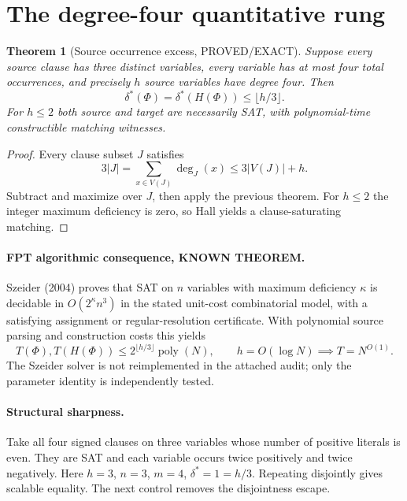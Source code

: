 \documentclass[11pt]{article}
\newtheorem{theorem}{Theorem}
\begin{document}
\section{The degree-four quantitative rung}
\begin{theorem}[Source occurrence excess, PROVED/EXACT]
Suppose every source clause has three distinct variables, every variable has at most four total occurrences, and precisely $h$ source variables have degree four. Then
\[
\boxed{\delta^*(\Phi)=\delta^*(H(\Phi))\le\lfloor h/3\rfloor}.
\]
For $h\le2$ both source and target are necessarily SAT, with polynomial-time constructible matching witnesses.
\end{theorem}
\begin{proof}
Every clause subset $J$ satisfies
\[
3|J|=\sum_{x\in V(J)}\deg_J(x)\le3|V(J)|+h.
\]
Subtract and maximize over $J$, then apply the previous theorem. For $h\le2$ the integer maximum deficiency is zero, so Hall yields a clause-saturating matching.
\end{proof}
\paragraph{FPT algorithmic consequence, KNOWN THEOREM.}
Szeider (2004) proves that SAT on $n$ variables with maximum deficiency $\kappa$ is decidable in $O(2^\kappa n^3)$ in the stated unit-cost combinatorial model, with a satisfying assignment or regular-resolution certificate. With polynomial source parsing and construction costs this yields
\[
T(\Phi),T(H(\Phi))\le2^{\lfloor h/3\rfloor}\operatorname{poly}(N),
\qquad h=O(\log N)\implies T=N^{O(1)}.
\]
The Szeider solver is not reimplemented in the attached audit; only the parameter identity is independently tested.
\paragraph{Structural sharpness.}
Take all four signed clauses on three variables whose number of positive literals is even. They are SAT and each variable occurs twice positively and twice negatively. Here $h=3$, $n=3$, $m=4$, $\delta^*=1=h/3$. Repeating disjointly gives scalable equality. The next control removes the disjointness escape.
\end{document}
